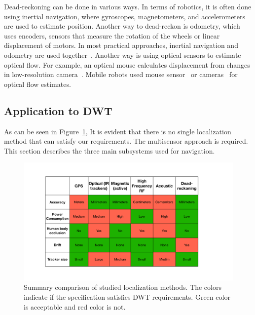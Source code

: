 Dead-reckoning can be done in various ways. In terms of robotics, it is often done using inertial navigation, where gyroscopes, magnetometers, and accelerometers are used to estimate position. Another way to dead-reckon is odometry, which uses encoders, sensors that measure the rotation of the wheels or linear displacement of motors. In most practical approaches, inertial navigation and odometry are used together~\cite{fuke1996dead,borenstein1996navigating}. Another way is using optical sensors to estimate optical flow. For example, an optical mouse calculates displacement from changes in low-resolution camera~\cite{lyon1981optical}. Mobile robots used mouse sensor~\cite{lee2004mobile} or cameras~\cite{honegger2013open} for optical flow estimates.

\subsection{Application to DWT}
As can be seen in Figure~\ref{fig:localization_compare}, It is evident that there is no single localization method that can satisfy our requirements. The multisensor approach is required. This section describes the three main subsystems used for navigation.

\begin{figure}[!ht]
\centering
\includegraphics[width=14.0cm]{pictures/chapter5/pic_comparison_navigation.pdf}
\caption{Summary comparison of studied localization methods. The colors indicate if the specification satisfies DWT requirements. Green color is acceptable and red color is not. }
\label{fig:localization_compare}
\end{figure}

